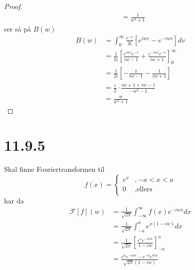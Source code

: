 \documentclass{report}
\newcommand{\nbrack}[1]{\left( #1 \right)}
\newcommand{\bbrack}[1]{\left[ #1 \right]}
\newcommand{\fft}[1]{\mathcal{F} \bbrack{ #1 } (w)}
\begin{document}
\begin{proof}
\begin{equation}
\begin{split}
          &= \frac{1}{w^{2} + 1}
    \end{split}
  \end{equation}
  ser så på $B(w)$
  \begin{equation}
    \label{eq:26}
    \begin{split}
      B(w) &= \int_{0}^{\infty} \frac{e^{-v}}{2i} \bbrack{ e^{iwv} - e^{-iwv} }dv \\
          &= \frac{1}{2i} \bbrack{ \frac{e^{iwv}e^{-v}}{iw-1} + \frac{e^{-iwv}e^{-v}}{iw + 1} }_{0}^{\infty} \\
          &= \frac{1}{2i} \bbrack{ -\frac{1}{iw-1} - \frac{1}{iw+1} } \\
          &= \frac{i}{2} \cdot \frac{iw+1 + iw-1}{-w^{2} - 1} \\
          &= \frac{w}{w^{2} + 1}
    \end{split}
  \end{equation}
\end{proof}



\section*{11.9.5}
Skal finne Fouriertransformen til
\begin{equation}
  \label{eq:27}
  f(x) = \left\lbrace
    \begin{array}{ll}
      e^{x} & , -a < x < a \\
      0 & , \text{ellers}
    \end{array} \right.
\end{equation}
har da
\begin{equation}
  \label{eq:28}
  \begin{split}
    \fft{f} &= \frac{1}{\sqrt{2\pi}} \int_{-\infty}^{\infty} f(x) e^{-iwx} dx \\
            &= \frac{1}{\sqrt{2\pi}} \int_{-a}^{a} e^{x(1-iw)} dx \\
            &= \frac{1}{\sqrt{2\pi}} \bbrack{\frac{e^{x}e^{-iwx}}{1-iw}}_{-a}^{a} \\
            &= \frac{e^{a}e^{-aiw} - e^{-a}e^{aiw}}{\sqrt{2\pi} \nbrack{ 1-iw }} \\
  \end{split}
\end{equation}
\end{document}
